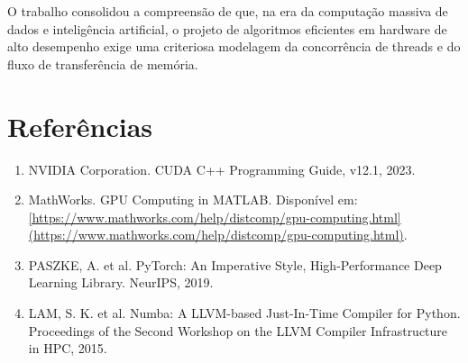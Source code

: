 \documentclass[12pt,a4paper]{article}
\begin{document}
O trabalho consolidou a compreensão de que, na era da computação massiva de dados e inteligência artificial, o projeto de algoritmos eficientes em hardware de alto desempenho exige uma criteriosa modelagem da concorrência de threads e do fluxo de transferência de memória.

\section{Referências}
\begin{enumerate}
    \item NVIDIA Corporation. CUDA C++ Programming Guide, v12.1, 2023.
    \item MathWorks. GPU Computing in MATLAB. Disponível em: \url{[https://www.mathworks.com/help/distcomp/gpu-computing.html](https://www.mathworks.com/help/distcomp/gpu-computing.html)}.
    \item PASZKE, A. et al. PyTorch: An Imperative Style, High-Performance Deep Learning Library. NeurIPS, 2019.
    \item LAM, S. K. et al. Numba: A LLVM-based Just-In-Time Compiler for Python. Proceedings of the Second Workshop on the LLVM Compiler Infrastructure in HPC, 2015.
\end{enumerate}
\end{document}
